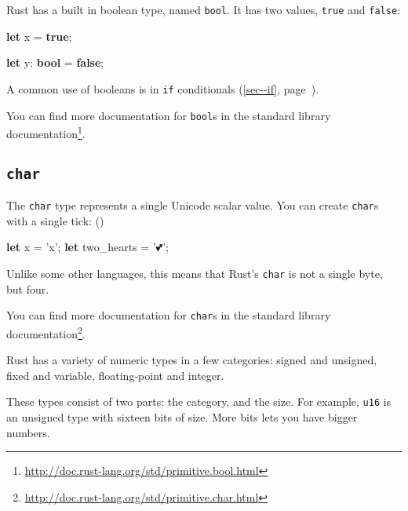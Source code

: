\documentclass[a4paper,]{book}
\renewcommand*{\hyperref}[2][\ar]{%
  \def\ar{#2}%
  #2 (\autoref{#1}, page~\pageref{#1})}
\newenvironment{Shaded}{\begin{snugshade}}{\end{snugshade}}
\newcommand{\KeywordTok}[1]{\textcolor[rgb]{0.13,0.29,0.53}{\textbf{{#1}}}}
\newcommand{\CharTok}[1]{\textcolor[rgb]{0.31,0.60,0.02}{{#1}}}
\newcommand{\NormalTok}[1]{{#1}}
\renewcommand{\href}[2]{#2\footnote{\url{#1}}}
\begin{document}
Rust has a built in boolean type, named \texttt{bool}. It has two
values, \texttt{true} and \texttt{false}:

\begin{Shaded}
\begin{Highlighting}[]
\KeywordTok{let} \NormalTok{x = }\KeywordTok{true}\NormalTok{;}

\KeywordTok{let} \NormalTok{y: }\KeywordTok{bool} \NormalTok{= }\KeywordTok{false}\NormalTok{;}
\end{Highlighting}
\end{Shaded}

A common use of booleans is in \hyperref[sec--if]{\texttt{if}
conditionals}.

You can find more documentation for \texttt{bool}s
\href{http://doc.rust-lang.org/std/primitive.bool.html}{in the standard
library documentation}.

\subsection{\texorpdfstring{\texttt{char}}{char}}\label{char}

The \texttt{char} type represents a single Unicode scalar value. You can
create \texttt{char}s with a single tick: (\texttt{\textquotesingle{}})

\begin{Shaded}
\begin{Highlighting}[]
\KeywordTok{let} \NormalTok{x = }\CharTok{'x'}\NormalTok{;}
\KeywordTok{let} \NormalTok{two_hearts = }\CharTok{'💕'}\NormalTok{;}
\end{Highlighting}
\end{Shaded}

Unlike some other languages, this means that Rust's \texttt{char} is not
a single byte, but four.

You can find more documentation for \texttt{char}s
\href{http://doc.rust-lang.org/std/primitive.char.html}{in the standard
library documentation}.


Rust has a variety of numeric types in a few categories: signed and
unsigned, fixed and variable, floating-point and integer.

These types consist of two parts: the category, and the size. For
example, \texttt{u16} is an unsigned type with sixteen bits of size.
More bits lets you have bigger numbers.
\end{document}
